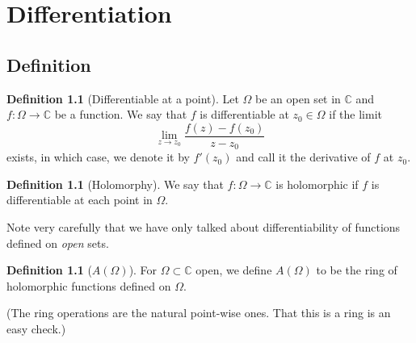 \documentclass[12pt,oneside]{book}
\theoremstyle{definition}
\numberwithin{thm}{chapter}
\newtheorem{defn}[thm]{Definition}
\begin{document}
\chapter{Differentiation}
\section{Definition}
\begin{defn}[Differentiable at a point]
	Let $\Omega$ be an open set in $\mathbb{C}$ and $f:\Omega \to \mathbb{C}$ be a function. We say that $f$ is differentiable at $z_0 \in \Omega$ if the limit
	\begin{equation*} 
		\lim_{z\to z_0}\dfrac{f(z) - f(z_0)}{z - z_0}
	\end{equation*}
	exists, in which case, we denote it by $f'(z_0)$ and call it the derivative of $f$ at $z_0.$
\end{defn}
\begin{defn}[Holomorphy]
	We say that $f:\Omega \to \mathbb{C}$ is holomorphic if $f$ is differentiable at each point in $\Omega.$
\end{defn}
Note very carefully that we have only talked about differentiability of functions defined on \emph{open} sets.

\begin{defn}[$A(\Omega)$]
	For $\Omega \subset \mathbb{C}$ open, we define $A(\Omega)$ to be the ring of holomorphic functions defined on $\Omega.$
\end{defn}
(The ring operations are the natural point-wise ones. That this is a ring is an easy check.)
\end{document}
